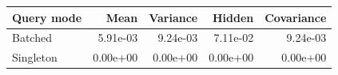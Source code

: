 \begin{tabular}{lrrrr}
\toprule Query mode & Mean & Variance & Hidden & Covariance \\
\midrule
Batched & 5.91e-03 & 9.24e-03 & 7.11e-02 & 9.24e-03 \\
Singleton & 0.00e+00 & 0.00e+00 & 0.00e+00 & 0.00e+00 \\
\bottomrule
\end{tabular}
